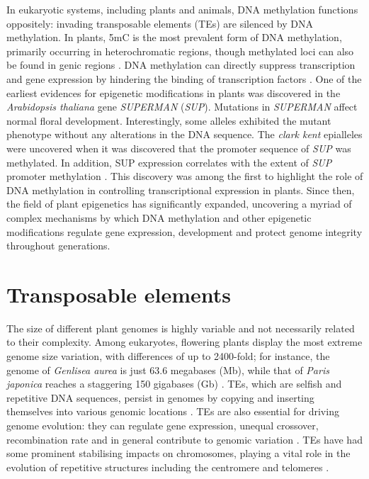 In eukaryotic systems, including plants and animals, DNA methylation functions oppositely: invading transposable elements (TEs) are silenced by DNA methylation. In plants, 5mC is the most prevalent form of DNA methylation, primarily occurring in heterochromatic regions, though methylated loci can also be found in genic regions \cite{RN228,RN193}. DNA methylation can directly suppress transcription and gene expression by hindering the binding of transcription factors \cite{RN290}. One of the earliest evidences for epigenetic modifications in plants was discovered in the \textit{Arabidopsis thaliana} gene \textit{SUPERMAN} (\textit{SUP}). Mutations in \textit{SUPERMAN} affect normal floral development. Interestingly, some alleles exhibited the mutant phenotype without any alterations in the DNA sequence. The \textit{clark kent} epialleles were uncovered when it was discovered that the promoter sequence of \textit{SUP} was methylated. In addition, SUP expression correlates with the extent of \textit{SUP} promoter methylation \cite{RN100}. This discovery was among the first to highlight the role of DNA methylation in controlling transcriptional expression in plants. Since then, the field of plant epigenetics has significantly expanded, uncovering a myriad of complex mechanisms by which DNA methylation and other epigenetic modifications regulate gene expression, development and protect genome integrity throughout generations.

\section{Transposable elements}

The size of different plant genomes is highly variable and not necessarily related to their complexity. Among eukaryotes, flowering plants display the most extreme genome size variation, with differences of up to 2400-fold; for instance, the genome of \textit{Genlisea aurea} is just 63.6 megabases (Mb), while that of \textit{Paris japonica} reaches a staggering 150 gigabases (Gb) \cite{RN76,RN81}. TEs, which are selfish and repetitive DNA sequences, persist in genomes by copying and inserting themselves into various genomic locations \cite{RN102}. TEs are also essential for driving genome evolution: they can regulate gene expression, unequal crossover, recombination rate and in general contribute to genomic variation \cite{RN103}. TEs have had some prominent stabilising impacts on  chromosomes, playing a vital role in the evolution  of repetitive structures including the centromere  and telomeres \cite{RN101}.

